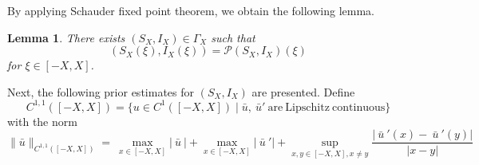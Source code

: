 \documentclass[final,3p,times]{elsarticle}
\newtheorem{lemma}{Lemma}[section]
\numberwithin{equation}{section}
\begin{document}
By applying Schauder fixed point theorem, we obtain the following lemma.
\begin{lemma}
There exists $(S_X,I_X)\in\Gamma_X$ such that
\[
(S_X(\xi),I_X(\xi)) = \mathcal{P}(S_X,I_X)(\xi)
\]
for $\xi\in[-X,X]$.
\end{lemma}
Next, the following prior estimates for $(S_X,I_X)$ are presented. Define
\[
C^{1,1}([-X,X])=\{u\in C^{1}([-X,X]) \mid \bar{u},~\bar{u}'~\mathrm{are} ~\mathrm{Lipschitz}~\mathrm{continuous} \}                                                                                                                            \]
with the norm
\[\parallel\bar{u}\parallel_{C^{1,1}([-X,X])}=~\max_{x\in[-X,X]}|\bar{~u~}|+\max_{x\in[-X,X]}|\bar{~u~}'|+\sup_{x,y\in[-X,X],x\neq y}\frac{|\bar{~u~}'(x)-\bar{~u~}'(y)|}{|x-y|}
\]
\end{document}
